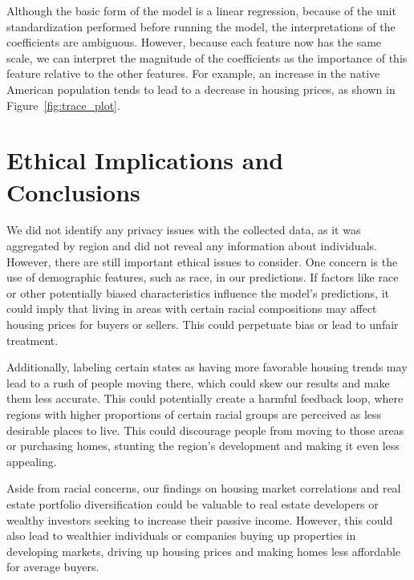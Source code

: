 \documentclass[11pt]{amsart}
\begin{document}
Although the basic form of the model is a linear regression, because of the unit standardization performed before running the model, the interpretations of the coefficients are ambiguous.
However, because each feature now has the same scale, we can interpret the magnitude of the coefficients as the importance of this feature relative to the other features.
For example, an increase in the native American population tends to lead to a decrease in housing prices, as shown in Figure~\ref{fig:trace_plot}.




\section{Ethical Implications and Conclusions}
We did not identify any privacy issues with the collected data, as it was aggregated by region and did not reveal any information about individuals. However, there are still important ethical issues to consider. One concern is the use of demographic features, such as race, in our predictions. If factors like race or other potentially biased characteristics influence the model's predictions, it could imply that living in areas with certain racial compositions may affect housing prices for buyers or sellers. This could perpetuate bias or lead to unfair treatment.

Additionally, labeling certain states as having more favorable housing trends may lead to a rush of people moving there, which could skew our results and make them less accurate. This could potentially create a harmful feedback loop, where regions with higher proportions of certain racial groups are perceived as less desirable places to live. This could discourage people from moving to those areas or purchasing homes, stunting the region's development and making it even less appealing.

Aside from racial concerns, our findings on housing market correlations and real estate portfolio diversification could be valuable to real estate developers or wealthy investors seeking to increase their passive income. However, this could also lead to wealthier individuals or companies buying up properties in developing markets, driving up housing prices and making homes less affordable for average buyers.
\end{document}
